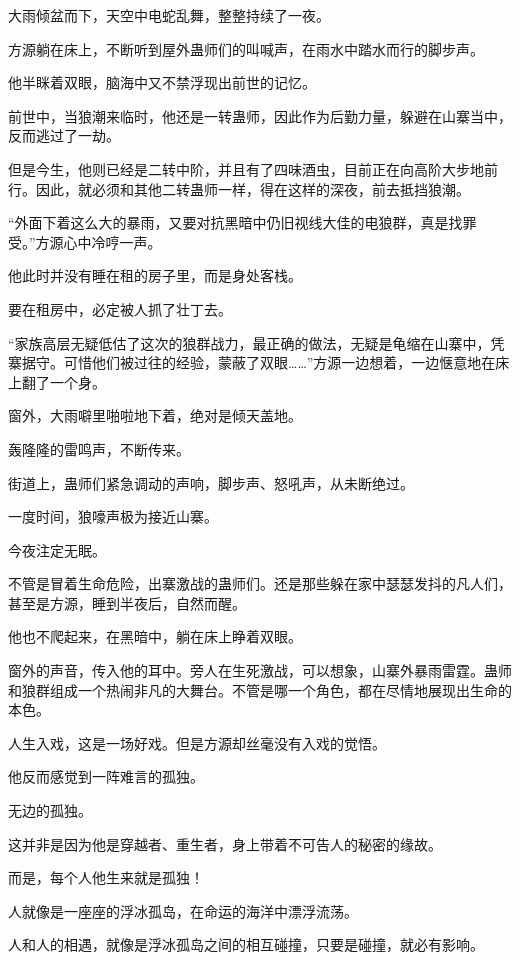 
\begin{this_body}

大雨倾盆而下，天空中电蛇乱舞，整整持续了一夜。

方源躺在床上，不断听到屋外蛊师们的叫喊声，在雨水中踏水而行的脚步声。

他半眯着双眼，脑海中又不禁浮现出前世的记忆。

前世中，当狼潮来临时，他还是一转蛊师，因此作为后勤力量，躲避在山寨当中，反而逃过了一劫。

但是今生，他则已经是二转中阶，并且有了四味酒虫，目前正在向高阶大步地前行。因此，就必须和其他二转蛊师一样，得在这样的深夜，前去抵挡狼潮。

“外面下着这么大的暴雨，又要对抗黑暗中仍旧视线大佳的电狼群，真是找罪受。”方源心中冷哼一声。

他此时并没有睡在租的房子里，而是身处客栈。

要在租房中，必定被人抓了壮丁去。

“家族高层无疑低估了这次的狼群战力，最正确的做法，无疑是龟缩在山寨中，凭寨据守。可惜他们被过往的经验，蒙蔽了双眼……”方源一边想着，一边惬意地在床上翻了一个身。

窗外，大雨噼里啪啦地下着，绝对是倾天盖地。

轰隆隆的雷鸣声，不断传来。

街道上，蛊师们紧急调动的声响，脚步声、怒吼声，从未断绝过。

一度时间，狼嚎声极为接近山寨。

今夜注定无眠。

不管是冒着生命危险，出寨激战的蛊师们。还是那些躲在家中瑟瑟发抖的凡人们，甚至是方源，睡到半夜后，自然而醒。

他也不爬起来，在黑暗中，躺在床上睁着双眼。

窗外的声音，传入他的耳中。旁人在生死激战，可以想象，山寨外暴雨雷霆。蛊师和狼群组成一个热闹非凡的大舞台。不管是哪一个角色，都在尽情地展现出生命的本色。

人生入戏，这是一场好戏。但是方源却丝毫没有入戏的觉悟。

他反而感觉到一阵难言的孤独。

无边的孤独。

这并非是因为他是穿越者、重生者，身上带着不可告人的秘密的缘故。

而是，每个人他生来就是孤独！

人就像是一座座的浮冰孤岛，在命运的海洋中漂浮流荡。

人和人的相遇，就像是浮冰孤岛之间的相互碰撞，只要是碰撞，就必有影响。


\end{this_body}
